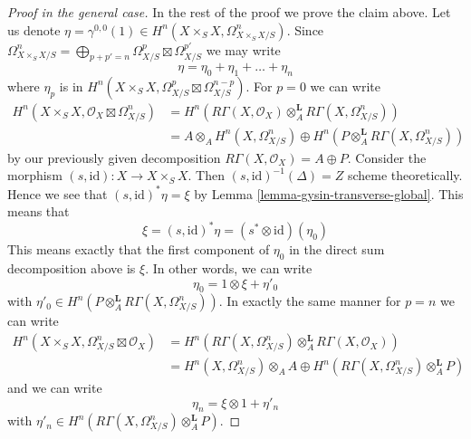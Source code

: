 \begin{proof}[Proof in the general case]
\medskip\noindent
In the rest of the proof we prove the claim above. Let us denote
$\eta = \gamma^{0, 0}(1) \in H^n(X \times_S X, \Omega^n_{X \times_S X/S})$.
Since $\Omega^n_{X \times_S X/S} =
\bigoplus_{p + p' = n} \Omega^p_{X/S} \boxtimes \Omega^{p'}_{X/S}$
we may write
$$
\eta = \eta_0 + \eta_1 + \ldots + \eta_n
$$
where $\eta_p$ is in
$H^n(X \times_S X, \Omega^p_{X/S} \boxtimes \Omega^{n - p}_{X/S})$.
For $p = 0$ we can write
\begin{align*}
H^n(X \times_S X, \mathcal{O}_X \boxtimes \Omega^n_{X/S})
& =
H^n(R\Gamma(X, \mathcal{O}_X) \otimes_A^\mathbf{L}
R\Gamma(X, \Omega^n_{X/S})) \\
& =
A \otimes_A H^n(X, \Omega^n_{X/S}) \oplus
H^n(P \otimes_A^\mathbf{L} R\Gamma(X, \Omega^n_{X/S}))
\end{align*}
by our previously given decomposition $R\Gamma(X, \mathcal{O}_X) = A \oplus P$.
Consider the morphism $(s, \text{id}) : X \to X \times_S X$.
Then $(s, \text{id})^{-1}(\Delta) = Z$ scheme theoretically.
Hence we see that $(s, \text{id})^*\eta = \xi$ by
Lemma \ref{lemma-gysin-transverse-global}. This means that
$$
\xi = (s, \text{id})^*\eta = (s^* \otimes \text{id})(\eta_0)
$$
This means exactly that the first component of $\eta_0$
in the direct sum decomposition above is $\xi$. In other words, we can write
$$
\eta_0 = 1 \otimes \xi + \eta'_0
$$
with $\eta'_0 \in H^n(P \otimes_A^\mathbf{L} R\Gamma(X, \Omega^n_{X/S}))$.
In exactly the same manner for $p = n$ we can write
\begin{align*}
H^n(X \times_S X, \Omega^n_{X/S} \boxtimes \mathcal{O}_X)
& =
H^n(R\Gamma(X, \Omega^n_{X/S}) \otimes_A^\mathbf{L}
R\Gamma(X, \mathcal{O}_X)) \\
& =
H^n(X, \Omega^n_{X/S}) \otimes_A A \oplus
H^n(R\Gamma(X, \Omega^n_{X/S}) \otimes_A^\mathbf{L} P)
\end{align*}
and we can write
$$
\eta_n = \xi \otimes 1 + \eta'_n
$$
with $\eta'_n \in H^n(R\Gamma(X, \Omega^n_{X/S}) \otimes_A^\mathbf{L} P)$.


\end{proof}
